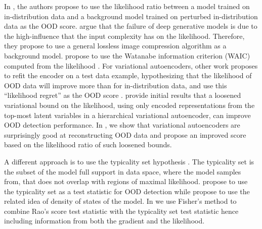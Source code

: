 In \textcite{ren_likelihood_2019}, the authors propose to use the likelihood ratio between a model trained on in-distribution data and a background model trained on perturbed in-distribution data as the OOD score. 
\textcite{serra_input_2020} argue that the failure of deep generative models is due to the high-influence that the input complexity has on the likelihood. Therefore, they propose to use a general lossless image compression algorithm as a background model. 
\textcite{choi_waic_2019} propose to use the Watanabe information criterion (WAIC) computed from the likelihood \parencite{watanabe_algebraic_2009, watanabe_asymptotic_2010}. 
For variational autoencoders, other work proposes to refit the encoder on a test data example, hypothesizing that the likelihood of OOD data will improve more than for in-distribution data, and use this ``likelihood regret'' as the OOD score \parencite{xiao_likelihood_2020}. 
\textcite{maaloe_biva_2019} provide initial results that a loosened variational bound on the likelihood, using only encoded representations from the top-most latent variables in a hierarchical variational autoencoder, can improve OOD detection performance. In \textcite{havtorn_hierarchical_2021}, we show that variational autoencoders are surprisingly good at reconstructing OOD data and propose an improved score based on the likelihood ratio of such loosened bounds.

A different approach is to use the typicality set hypothesis \parencite{nalisnick_detecting_2019}. The typicality set is the subset of the model full support in data space, where the model samples from, that does not overlap with regions of maximal likelihood. \textcite{nalisnick_detecting_2019} propose to use the typicality set as a test statistic for OOD detection while \textcite{morningstar_density_2021} propose to use the related idea of density of states of the model. 
In \textcite{bergamin_modelagnostic_2022} we use Fisher's method \parencite{fisher_statistical_1925} to combine Rao's score test statistic \parencite{rao_large_1948} with the typicality set test statistic hence including information from both the gradient and the likelihood.



